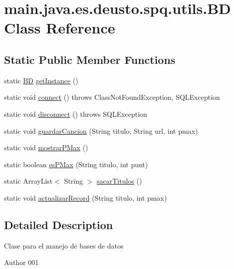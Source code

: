 \hypertarget{classmain_1_1java_1_1es_1_1deusto_1_1spq_1_1utils_1_1_b_d}{}\section{main.\+java.\+es.\+deusto.\+spq.\+utils.\+BD Class Reference}
\label{classmain_1_1java_1_1es_1_1deusto_1_1spq_1_1utils_1_1_b_d}
\subsection*{Static Public Member Functions}
\begin{DoxyCompactItemize}
\item 
static \hyperlink{classmain_1_1java_1_1es_1_1deusto_1_1spq_1_1utils_1_1_b_d}{BD} \hyperlink{classmain_1_1java_1_1es_1_1deusto_1_1spq_1_1utils_1_1_b_d_ab4ecb43df9758f1d9a042b6bbed09bf1}{get\+Instance} ()
\item 
static void \hyperlink{classmain_1_1java_1_1es_1_1deusto_1_1spq_1_1utils_1_1_b_d_a69ea763009d4bed986121d5d92dc2e58}{connect} ()  throws Class\+Not\+Found\+Exception, S\+Q\+L\+Exception 
\item 
static void \hyperlink{classmain_1_1java_1_1es_1_1deusto_1_1spq_1_1utils_1_1_b_d_acb9d601429902459fa486d736da6d50b}{disconnect} ()  throws S\+Q\+L\+Exception 
\item 
static void \hyperlink{classmain_1_1java_1_1es_1_1deusto_1_1spq_1_1utils_1_1_b_d_a9325aeed40da428c9f76f912c0d6f425}{guardar\+Cancion} (String titulo, String url, int pmax)
\item 
static void \hyperlink{classmain_1_1java_1_1es_1_1deusto_1_1spq_1_1utils_1_1_b_d_adcf2463a9697162a9d8d461f1c0e3821}{mostrar\+P\+Max} ()
\item 
static boolean \hyperlink{classmain_1_1java_1_1es_1_1deusto_1_1spq_1_1utils_1_1_b_d_ae7d2915f3528081e196a56fa6da6c829}{es\+P\+Max} (String titulo, int punt)
\item 
static Array\+List$<$ String $>$ \hyperlink{classmain_1_1java_1_1es_1_1deusto_1_1spq_1_1utils_1_1_b_d_a26cc1c853d5d94da3748cbf88bc7de35}{sacar\+Titulos} ()
\item 
static void \hyperlink{classmain_1_1java_1_1es_1_1deusto_1_1spq_1_1utils_1_1_b_d_ac9466c281e7b7df6baceb454369d3c71}{actualizar\+Record} (String titulo, int pmax)
\end{DoxyCompactItemize}


\subsection{Detailed Description}
Clase para el manejo de bases de datos \begin{DoxyAuthor}{Author}
001 
\end{DoxyAuthor}


